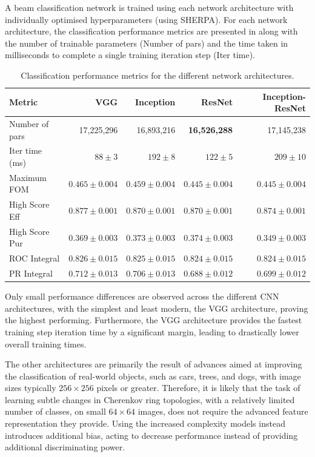 A beam classification network is trained using each network architecture with individually
optimised hyperparameters (using SHERPA). For each network architecture, the classification
performance metrics are presented in  along with the number of trainable
parameters (Number of pars) and the time taken in milliseconds to complete a single training
iteration step (Iter time).

\begin{table} %
    \begin{tabular}{lrrrr}
        Metric         & VGG            & Inception  & ResNet              & Inception-ResNet \\
        \midrule
        Number of pars & 17,225,296     & 16,893,216 & \textbf{16,526,288} & 17,145,238       \\
        Iter time (ms) & \textbf{$88\pm3$}        & $192\pm8$       & $122\pm5$                & $209\pm10$ \\
        Maximum FOM    & \textbf{$0.465\pm0.004$} & $0.459\pm0.004$ & $0.445\pm0.004$          & $0.445\pm0.004$ \\
        High Score Eff & \textbf{$0.877\pm0.001$} & $0.870\pm0.001$ & $0.870\pm0.001$          & $0.874\pm0.001$ \\
        High Score Pur & $0.369\pm0.003$          & $0.373\pm0.003$ & \textbf{$0.374\pm0.003$} & $0.349\pm0.003$ \\
        ROC Integral   & \textbf{$0.826\pm0.015$} & $0.825\pm0.015$ & $0.824\pm0.015$          & $0.824\pm0.015$ \\
        PR Integral    & \textbf{$0.712\pm0.013$} & $0.706\pm0.013$ & $0.688\pm0.012$          & $0.699\pm0.012$ \\
    \end{tabular}
    \caption[Classification performance metrics for different network architectures]
    {Classification performance metrics for the different network architectures.}
    \label{tab:arch}
\end{table}

Only small performance differences are observed across the different CNN architectures, with the
simplest and least modern, the VGG architecture, proving the highest performing. Furthermore, the
VGG architecture provides the fastest training step iteration time by a significant margin,
leading to drastically lower overall training times.

The other architectures are primarily the result of advances aimed at improving the classification
of real-world objects, such as cars, trees, and dogs, with image sizes typically $256\times256$
pixels or greater. Therefore, it is likely that the task of learning subtle changes in Cherenkov
ring topologies, with a relatively limited number of classes, on small $64\times64$ images, does
not require the advanced feature representation they provide. Using the increased complexity
models instead introduces additional bias, acting to decrease performance instead of providing
additional discriminating power.